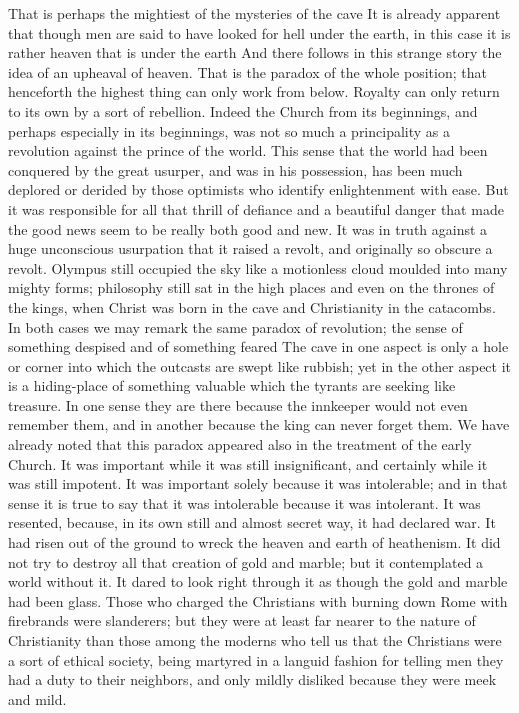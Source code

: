 That is perhaps the mightiest of the mysteries of the cave It is already apparent that though men are said to have looked for hell under the earth, in this case it is rather heaven that is under the earth And there follows in this strange story the idea of an upheaval of heaven. That is the paradox of the whole position; that henceforth the highest thing can only work from below. Royalty can only return to its own by a sort of rebellion. Indeed the Church from its beginnings, and perhaps especially in its beginnings, was not so much a principality as a revolution against the prince of the world. This sense that the world had been conquered by the great usurper, and was in his possession, has been much deplored or derided by those optimists who identify enlightenment with ease. But it was responsible for all that thrill of defiance and a beautiful danger that made the good news seem to be really both good and new. It was in truth against a huge unconscious usurpation that it raised a revolt, and originally so obscure a revolt. Olympus still occupied the sky like a motionless cloud moulded into many mighty forms; philosophy still sat in the high places and even on the thrones of the kings, when Christ was born in the cave and Christianity in the catacombs. In both cases we may remark the same paradox of revolution; the sense of something despised and of something feared The cave in one aspect is only a hole or corner into which the outcasts are swept like rubbish; yet in the other aspect it is a hiding-place of something valuable which the tyrants are seeking like treasure. In one sense they are there because the innkeeper would not even remember them, and in another because the king can never forget them. We have already noted that this paradox appeared also in the treatment of the early Church. It was important while it was still insignificant, and certainly while it was still impotent. It was important solely because it was intolerable; and in that sense it is true to say that it was intolerable because it was intolerant. It was resented, because, in its own still and almost secret way, it had declared war. It had risen out of the ground to wreck the heaven and earth of heathenism. It did not try to destroy all that creation of gold and marble; but it contemplated a world without it. It dared to look right through it as though the gold and marble had been glass. Those who charged the Christians with burning down Rome with firebrands were slanderers; but they were at least far nearer to the nature of Christianity than those among the moderns who tell us that the Christians were a sort of ethical society, being martyred in a languid fashion for telling men they had a duty to their neighbors, and only mildly disliked because they were meek and mild.

